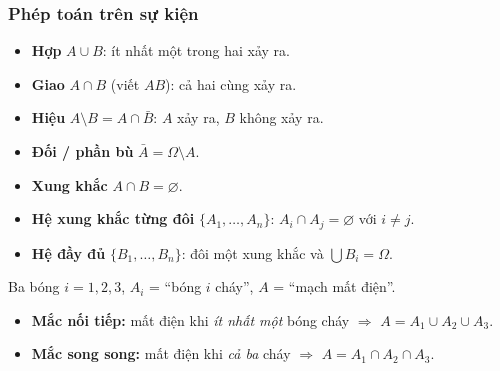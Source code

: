 \documentclass[12pt,a4paper]{article}
\begin{document}
\subsubsection{Phép toán trên sự kiện}

\begin{dinhnghia}
  \begin{itemize}
    \item \textbf{Hợp} $A \cup B$: ít nhất một trong hai xảy ra.
    \item \textbf{Giao} $A \cap B$ (viết $AB$): cả hai cùng xảy ra.
    \item \textbf{Hiệu} $A \setminus B = A \cap \bar{B}$: $A$ xảy ra, $B$ không xảy ra.
    \item \textbf{Đối / phần bù} $\bar{A} = \Omega \setminus A$.
    \item \textbf{Xung khắc} $A \cap B = \varnothing$.
    \item \textbf{Hệ xung khắc từng đôi} $\{A_1,\ldots,A_n\}$: $A_i \cap A_j = \varnothing$ với $i \neq j$.
    \item \textbf{Hệ đầy đủ} $\{B_1,\ldots,B_n\}$: đôi một xung khắc và $\bigcup B_i = \Omega$.
  \end{itemize}
\end{dinhnghia}

\begin{vidu}[title={Hợp và giao - mạch điện}]
Ba bóng $i = 1,2,3$, $A_i$ = ``bóng $i$ cháy'', $A$ = ``mạch mất điện''.
\begin{itemize}
  \item \textbf{Mắc nối tiếp:} mất điện khi \emph{ít nhất một} bóng cháy $\Rightarrow$ $A = A_1 \cup A_2 \cup A_3$.
  \item \textbf{Mắc song song:} mất điện khi \emph{cả ba} cháy $\Rightarrow$ $A = A_1 \cap A_2 \cap A_3$.
\end{itemize}
\end{vidu}
\end{document}
